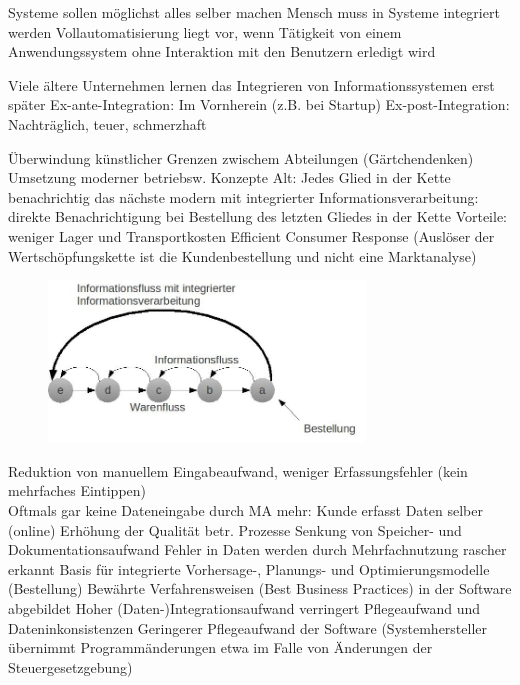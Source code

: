 \documentclass[ngerman,a4paper,12pt]{scrreprt}
\begin{document}
\ul
	\li Systeme sollen möglichst alles selber machen
	\li Mensch muss in Systeme integriert werden
	\li Vollautomatisierung liegt vor, wenn Tätigkeit von einem Anwendungssystem ohne Interaktion mit den Benutzern erledigt wird
\ulE

\ul
	\li Viele ältere Unternehmen lernen das Integrieren von Informationssystemen erst später
	\li Ex-ante-Integration: Im Vornherein (z.B. bei Startup)
	\li Ex-post-Integration: Nachträglich, teuer, schmerzhaft
\ulE


\ul
	\li Überwindung künstlicher Grenzen zwischem Abteilungen (Gärtchendenken)
	\li Umsetzung moderner betriebsw. Konzepte 
		\ul
			\li Alt: Jedes Glied in der Kette benachrichtig das nächste
			\li modern mit integrierter Informationsverarbeitung: direkte Benachrichtigung bei Bestellung des letzten Gliedes in der Kette
			\li Vorteile: weniger Lager und Transportkosten
			\li Efficient Consumer Response (Auslöser der Wertschöpfungskette ist die Kundenbestellung und nicht eine Marktanalyse)
		\ulE
		\begin{figure}[H]
			\centering
			\includegraphics[width=0.75\textwidth]{img/V9.3.jpg}
			\caption{}
			\label{}
		\end{figure}
	\li Reduktion von manuellem Eingabeaufwand, weniger Erfassungsfehler (kein mehrfaches Eintippen)\\
		\ra Oftmals gar keine Dateneingabe durch MA mehr: Kunde erfasst Daten selber (online)
	\li Erhöhung der Qualität betr. Prozesse
	\li Senkung von Speicher- und Dokumentationsaufwand
	\li Fehler in Daten werden durch Mehrfachnutzung rascher erkannt
	\li Basis für integrierte Vorhersage-, Planungs- und Optimierungsmodelle (Bestellung)
	\li Bewährte Verfahrensweisen (Best Business Practices) in der Software abgebildet
	\li Hoher (Daten-)Integrationsaufwand verringert Pflegeaufwand und Dateninkonsistenzen
	\li Geringerer Pflegeaufwand der Software (Systemhersteller übernimmt Programmänderungen etwa im Falle von Änderungen der Steuergesetzgebung)
\ulE
\end{document}
